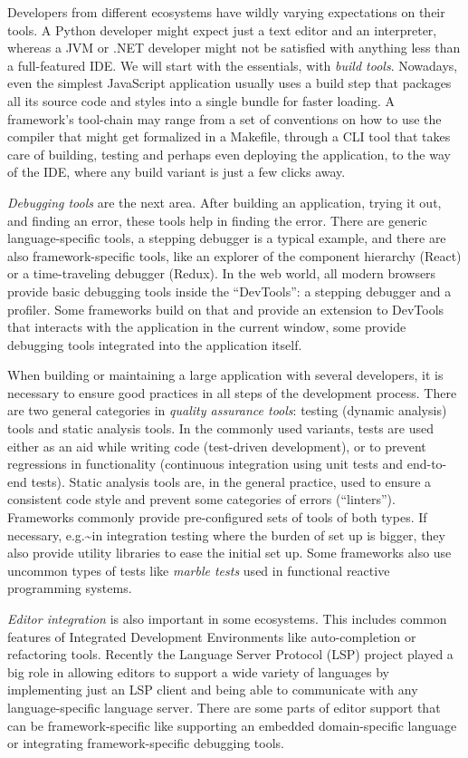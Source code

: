 \documentclass[english,odsaz]{fitthesis}
\begin{document}
Developers from different ecosystems have wildly varying expectations on their
tools. A Python developer might expect just a text editor and an interpreter,
whereas a JVM or .NET developer might not be satisfied with anything less than a
full-featured IDE. We will start with the essentials, with \emph{build
tools}. Nowadays, even the simplest JavaScript application usually uses a build
step that packages all its source code and styles into a single bundle for
faster loading. A framework's tool-chain may range from a set of conventions on
how to use the compiler that might get formalized in a Makefile, through a CLI
tool that takes care of building, testing and perhaps even deploying the
application, to the way of the IDE, where any build variant is just a few clicks
away.

\emph{Debugging tools} are the next area. After building an application, trying it out,
and finding an error, these tools help in finding the error. There are generic
language-specific tools, a stepping debugger is a typical example, and there are
also framework-specific tools, like an explorer of the component hierarchy
(React) or a time-traveling debugger (Redux). In the web world, all modern
browsers provide basic debugging tools inside the ``DevTools'': a stepping
debugger and a profiler. Some frameworks build on that and provide an extension
to DevTools that interacts with the application in the current window, some
provide debugging tools integrated into the application itself.

When building or maintaining a large application with several developers, it is
necessary to ensure good practices in all steps of the development
process. There are two general categories in \emph{quality assurance tools}: testing
(dynamic analysis) tools and static analysis tools. In the commonly used
variants, tests are used either as an aid while writing code (test-driven
development), or to prevent regressions in functionality (continuous integration
using unit tests and end-to-end tests). Static analysis tools are, in the
general practice, used to ensure a consistent code style and prevent some
categories of errors (``linters''). Frameworks commonly provide pre-configured
sets of tools of both types. If necessary, e.g.\textasciitilde{}in integration testing where the
burden of set up is bigger, they also provide utility libraries to ease the
initial set up. Some frameworks also use uncommon types of tests like \emph{marble
tests} used in functional reactive programming systems.

\emph{Editor integration} is also important in some ecosystems. This includes common
features of Integrated Development Environments like auto-completion or
refactoring tools. Recently the Language Server Protocol (LSP) \cite{lsp} project
played a big role in allowing editors to support a wide variety of languages by
implementing just an LSP client and being able to communicate with any
language-specific language server. There are some parts of editor support that
can be framework-specific like supporting an embedded domain-specific language
or integrating framework-specific debugging tools.
\end{document}
